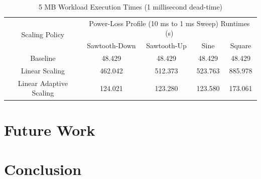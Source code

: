\documentclass[journal, twoside]{IEEEtran}
\begin{document}
\begin{table}
    \renewcommand{\arraystretch}{1.3} %
    \caption{5 MB Workload Execution Times (1 millisecond dead-time)}
    \label{power-loss-profile-performance}
    \centering
    \begin{tabular}{c||c|c|c|c}
        \hline
        \multirow{2}{*}{Scaling Policy} & \multicolumn{4}{c}{Power-Loss Profile (10 ms to 1 ms Sweep) Runtimes (s)} \\\cline{2-5}
        {} & {Sawtooth-Down} & {Sawtooth-Up} & {Sine} & {Square}\\
        \hline
        \hline
        {Baseline}                  &  {48.429} &  {48.429} &  {48.429} &  {48.429}\\
        {Linear Scaling}            & {462.042} & {512.373} & {523.763} & {885.978}\\
        {Linear Adaptive Scaling}   & {124.021} & {123.280} & {123.580} & {173.061}\\
        \hline
    \end{tabular}
\end{table}

\section{Future Work}

\section{Conclusion}



\end{document}

